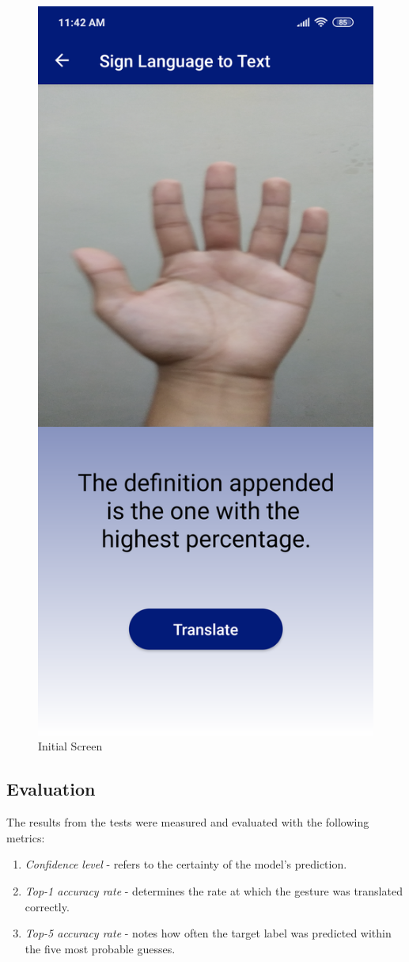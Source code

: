 \documentclass[journal]{./IEEE/IEEEtran}
\begin{document}
\begin{figure}[ht!]
    \centering
    \includegraphics[width=0.58\linewidth]{./images/screen_stt_initial.png}
    \caption{Initial Screen}
    \label{fig:stt_initial}
\end{figure}


\subsection{Evaluation}
The results from the tests were measured and evaluated with the following metrics:
\begin{enumerate}
    \item \textit{Confidence level} - refers to the certainty of the model's prediction.
    \item \textit{Top-1 accuracy rate} - determines the rate at which the gesture was translated correctly.
    \item \textit{Top-5 accuracy rate} - notes how often the target label was predicted within the five most probable guesses.
\end{enumerate}
\end{document}

